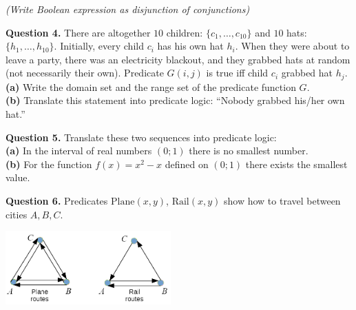 \documentclass[jou]{apa6}
\begin{document}
\noindent
{\scriptsize \em (Write Boolean expression as disjunction of conjunctions)}




\vspace{40pt}
{\bf Question 4.} There are altogether $10$ children: $\{ c_1,\ldots,c_{10} \}$ and 
$10$ hats: $\{ h_1,\ldots,h_{10} \}$. Initially, every child $c_i$ has his own hat $h_i$.
When they were about to leave a party, there was an electricity 
blackout, and they grabbed hats at random (not necessarily their own). 
Predicate $G(i,j)$ is true iff child $c_i$ grabbed hat $h_j$.\\
{\bf (a)} Write the domain set and the range set of the 
predicate function $G$.\\
{\bf (b)} Translate this statement into predicate logic: ``Nobody grabbed his/her own hat.''


\vspace{40pt}
{\bf Question 5.} Translate these two sequences into predicate logic:\\
{\bf (a)} In the interval of real numbers $(0;1)$ there is no smallest number.\\
{\bf (b)} For the function $f(x) = x^2 - x$ defined on $(0;1)$ there exists the smallest value.


\vspace{40pt}
{\bf Question 6.} Predicates $\mathrm{Plane}(x,y)$, 
$\mathrm{Rail}(x,y)$ show how to travel between cities $A,B,C$. 

\begin{center}
\includegraphics[width=2.5in]{relation-graphs.png}
\end{center}
\end{document}
